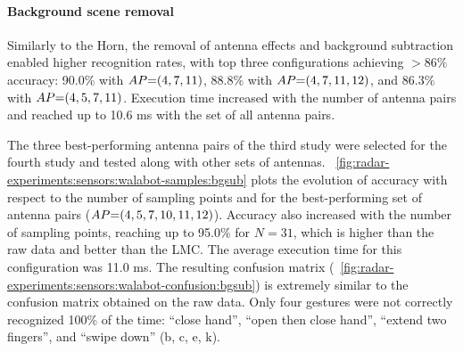 \paragraph{Background scene removal}
Similarly to the Horn, the removal of antenna effects and background subtraction enabled higher recognition rates, with top three configurations achieving ${>}86\%$ accuracy: 90.0\% with $\splitatcommas{AP{=}(4, 7, 11)}$, 88.8\% with $\splitatcommas{AP{=}(4, 7, 11, 12)}$, and 86.3\% with $\splitatcommas{AP{=}(4, 5, 7, 11)}$. Execution time increased with the number of antenna pairs and reached up to 10.6 ms with the set of all antenna pairs. 

The three best-performing antenna pairs of the third study were selected for the fourth study and tested along with other sets of antennas. 
%
\fig~\ref{fig:radar-experiments:sensors:walabot-samples:bgsub} plots the evolution of accuracy with respect to the number of sampling points and for the best-performing set of antenna pairs ($\splitatcommas{AP{=}(4,5,7,10,11,12)}$). 
%
Accuracy also increased with the number of sampling points, reaching up to 95.0\% for $N{=}31$, which is higher than the raw data and better than the LMC. The average execution time for this configuration was 11.0 ms.
%
The resulting confusion matrix (\fig~\ref{fig:radar-experiments:sensors:walabot-confusion:bgsub}) is extremely similar to the confusion matrix obtained on the raw data. Only four gestures were not correctly recognized 100\% of the time: ``close hand'', ``open then close hand'', ``extend two fingers'', and ``swipe down'' (b, c, e, k).

